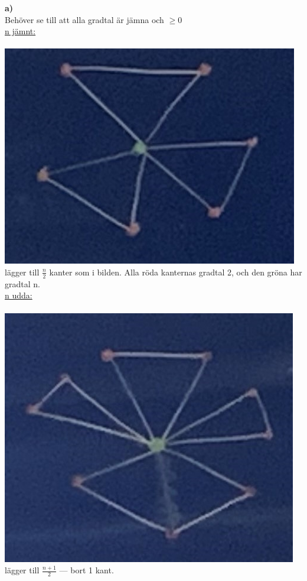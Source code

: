 \documentclass{article}
\begin{document}
                \begin{tabbing}
                    \indent \textbf{a)}\hspace{5pt}\=\\
                    \>Behöver se till att alla gradtal är jämna och $\ge 0$\\
                    \>\underline{n jämnt:}\\\\
                    \>\includegraphics[scale=0.2]{img04.png}\\
                    \>lägger till $\frac{n}{2}$ kanter som i bilden. 
                    Alla röda kanternas gradtal 2, och den gröna har gradtal n.\\
                    \>\underline{n udda:}\\\\
                    \>\includegraphics[scale=0.2]{img05.png}\\
                    \>lägger till $\frac{n+1}{2}$ --- bort 1 kant.
                \end{tabbing}
\end{document}
